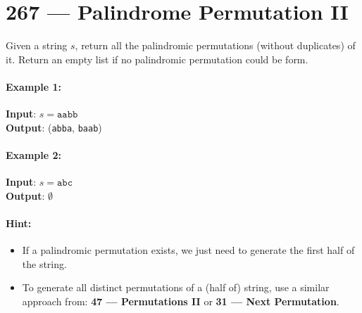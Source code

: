 \section{267 --- Palindrome Permutation II}
Given a string $s$, return all the palindromic permutations (without duplicates) of it. Return an empty list if no palindromic permutation could be form.
\paragraph{Example 1:}
\begin{flushleft}
\textbf{Input}: $s=\texttt{aabb}$
\\
\textbf{Output}: (\texttt{abba}, \texttt{baab})
\end{flushleft}

\paragraph{Example 2:}
\begin{flushleft}
\textbf{Input}: $s=\texttt{abc}$
\\
\textbf{Output}: $\emptyset$
\end{flushleft}

\paragraph{Hint:}
\begin{itemize}
\item If a palindromic permutation exists, we just need to generate the first half of the string.
\item To generate all distinct permutations of a (half of) string, use a similar approach from: \textbf{47 --- Permutations II} or \textbf{31 --- Next Permutation}.
\end{itemize}
